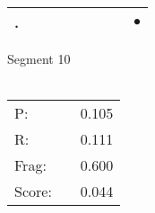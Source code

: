 \documentclass[landscape]{article}
\newcommand{\ssp}{\hspace{2pt}}
\newcommand{\mex}{\cellcolor{g}$\bullet$}
\begin{document}
\begin{tabular}{|l|p{10pt}|p{10pt}|p{10pt}|p{10pt}|p{10pt}|p{10pt}|p{10pt}|p{10pt}|}
\hline
\ssp \cellcolor{ref7}. \ssp&\hspace{2pt}&\hspace{2pt}&\hspace{2pt}&\hspace{2pt}&\hspace{2pt}&\hspace{2pt}&\hspace{2pt}&\hspace{2pt}\mex\\
\hline
\end{tabular}

\vspace{6pt}
\noindent Segment 10\\\\
\noindent\begin{tabular}{lm{12pt}r}
\hline
P:&&0.105\\
R:&&0.111\\
Frag:&&0.600\\
Score:&&0.044\\
\end{tabular}

\newpage
\end{document}
